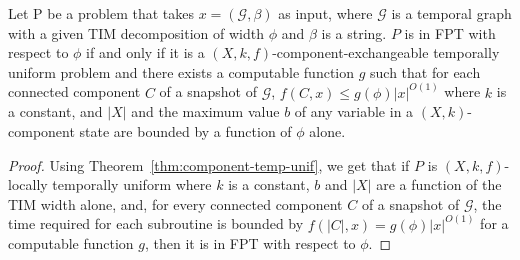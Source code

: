 \documentclass[a4paper,UKenglish,cleveref, autoref, thm-restate]{lipics-v2021} %
\begin{document}
\begin{theoremrep}\label{thm:TIM-iff}
    Let P be a problem that takes $x=(\mathcal{G},\beta)$ as input, where $\mathcal{G}$ is a temporal graph with a given TIM decomposition of width $\phi$ and $\beta$ is a string. $P$ is in FPT with respect to $\phi$ if and only if it is a $(X,k,f)$-component-exchangeable temporally uniform problem and there exists a computable function $g$ such that for each connected component $C$ of a snapshot of $\mathcal{G}$, $f(C,x)\leq g(\phi)|x|^{O(1)}$ where $k$ is a constant, and $|X|$ and the maximum value $b$ of any variable in a $(X,k)$-component state are bounded by a function of $\phi$ alone. 
\end{theoremrep}
\begin{proof}
    Using Theorem~\ref{thm:component-temp-unif}, we get that if $P$ is $(X,k,f)$-locally temporally uniform where 
    $k$ is a constant, $b$ and $|X|$ are a function of the TIM width alone, and, for every connected component $C$ of a snapshot of $\mathcal{G}$, the time required for each subroutine is bounded by $f(|C|,x)=g(\phi)|x|^{O(1)}$ for a computable function $g$, then it is in FPT with respect to $\phi$.


\end{proof}
\end{document}
